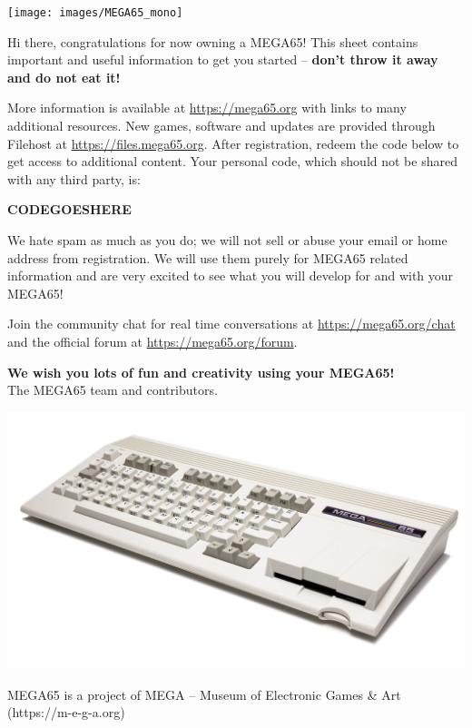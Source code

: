 



\begin{center}
\texttt{[image: images/MEGA65\_mono]}
\end{center}


{\small
Hi there, congratulations for now owning a MEGA65! This sheet contains important and useful information to get you started -- {\bf don't throw it away and do not eat it!}

More information is available at \underline{https://mega65.org} with links to many additional resources.  New games, software and updates are provided through Filehost at \underline{https://files.mega65.org}. After registration, redeem the code below to get access to additional content. Your personal code, which should not be shared with any third party, is:
}

\vspace{18pt}
\begin{center}
{\huge{\bf CODEGOESHERE}}
\end{center}
\vspace{18pt}

{\small
We hate spam as much as you do; we will not sell or abuse your email or home address from registration. We will use them purely for MEGA65 related information and are very excited to see what you will develop for and with your MEGA65!

Join the community chat for real time conversations at \underline{https://mega65.org/chat} and the official forum at \underline{https://mega65.org/forum}.

{\bf We wish you lots of fun and creativity using your MEGA65!} \\
The MEGA65 team and contributors.
}

\begin{center}
\includegraphics[width=0.7\linewidth]{images/MEGA65_photo}
\end{center}

\vspace*{\fill}
\begin{center}
{\small MEGA65 is a project of MEGA -- Museum of Electronic Games \& Art (https://m-e-g-a.org)}
\end{center}

\pagebreak



